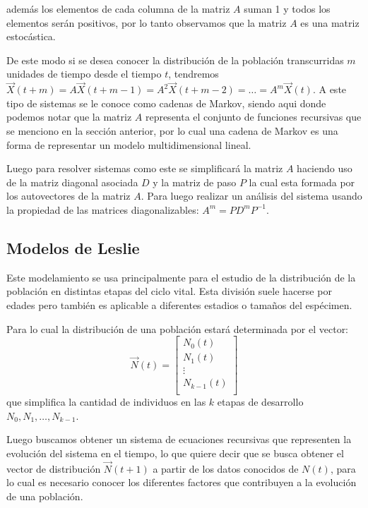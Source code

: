 además los elementos de cada columna de la matriz $A$ suman 1 y todos los elementos serán positivos, por lo tanto observamos que la matriz $A$ es una matriz estocástica.

De este modo si se desea conocer la distribución de la población transcurridas $m$ unidades de tiempo desde el tiempo $t$, tendremos $\vec{X}(t+m) = A\vec{X}(t+m-1) = A^{2}\vec{X}(t+m-2) = \dots = A^{m}\vec{X}(t)$. A este tipo de sistemas se le conoce como cadenas de Markov, siendo aqui donde podemos notar que la matriz $A$ representa el conjunto de funciones recursivas que se menciono en la sección anterior, por lo cual una cadena de Markov es una forma de representar un modelo multidimensional lineal.

Luego para resolver sistemas como este se simplificará la matriz  $A$ haciendo uso de la matriz diagonal asociada $D$ y la matriz de paso $P$ la cual esta formada por los autovectores de la matriz $A$. Para luego realizar un análisis del sistema usando la propiedad de las matrices diagonalizables: $A^{m} = PD^{m}P^{-1}$.


\subsection{Modelos de Leslie} %
\label{sec:Modelos de Leslie}

Este modelamiento se usa principalmente para el estudio de la distribución de la población en distintas etapas del ciclo vital. Esta división suele hacerse por edades pero también es aplicable a diferentes estadios o tamaños del espécimen. 

Para lo cual la distribución de una población estará determinada por el vector:
\[
	\vec{N}(t) = \left[\begin{array}{c} N_{0}(t)\\ N_{1}(t)\\ \vdots\\ N_{k-1}(t)\\ \end{array}\right]
\]
que simplifica la cantidad de individuos en las $k$ etapas de desarrollo $N_0,N_1,\dots,N_{k-1}$.

Luego buscamos obtener un sistema de ecuaciones recursivas que representen la evolución del sistema en el tiempo, lo que quiere decir que se busca obtener el vector de distribución $\vec{N}(t+1)$ a partir de los datos conocidos de $N(t)$, para lo cual es necesario conocer los diferentes factores que contribuyen a la evolución de una población.

